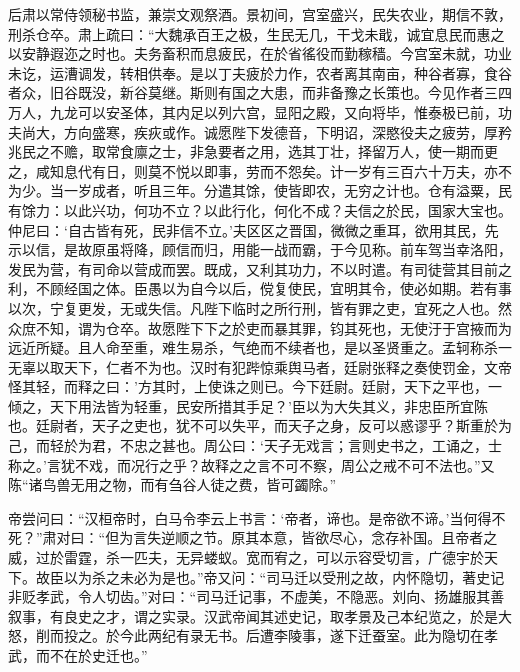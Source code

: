 \documentclass[12pt,UTF8]{ctexbook}
\begin{document}
后肃以常侍领秘书监，兼崇文观祭酒。景初间，宫室盛兴，民失农业，期信不敦，刑杀仓卒。肃上疏曰：“大魏承百王之极，生民无几，干戈未戢，诚宜息民而惠之以安静遐迩之时也。夫务畜积而息疲民，在於省徭役而勤稼穑。今宫室未就，功业未讫，运漕调发，转相供奉。是以丁夫疲於力作，农者离其南亩，种谷者寡，食谷者众，旧谷既没，新谷莫继。斯则有国之大患，而非备豫之长策也。今见作者三四万人，九龙可以安圣体，其内足以列六宫，显阳之殿，又向将毕，惟泰极已前，功夫尚大，方向盛寒，疾疢或作。诚愿陛下发德音，下明诏，深愍役夫之疲劳，厚矜兆民之不赡，取常食廪之士，非急要者之用，选其丁壮，择留万人，使一期而更之，咸知息代有日，则莫不悦以即事，劳而不怨矣。计一岁有三百六十万夫，亦不为少。当一岁成者，听且三年。分遣其馀，使皆即农，无穷之计也。仓有溢粟，民有馀力：以此兴功，何功不立？以此行化，何化不成？夫信之於民，国家大宝也。仲尼曰：‘自古皆有死，民非信不立。’夫区区之晋国，微微之重耳，欲用其民，先示以信，是故原虽将降，顾信而归，用能一战而霸，于今见称。前车驾当幸洛阳，发民为营，有司命以营成而罢。既成，又利其功力，不以时遣。有司徒营其目前之利，不顾经国之体。臣愚以为自今以后，傥复使民，宜明其令，使必如期。若有事以次，宁复更发，无或失信。凡陛下临时之所行刑，皆有罪之吏，宜死之人也。然众庶不知，谓为仓卒。故愿陛下下之於吏而暴其罪，钧其死也，无使汙于宫掖而为远近所疑。且人命至重，难生易杀，气绝而不续者也，是以圣贤重之。孟轲称杀一无辜以取天下，仁者不为也。汉时有犯跸惊乘舆马者，廷尉张释之奏使罚金，文帝怪其轻，而释之曰：'方其时，上使诛之则已。今下廷尉。廷尉，天下之平也，一倾之，天下用法皆为轻重，民安所措其手足？'臣以为大失其义，非忠臣所宜陈也。廷尉者，天子之吏也，犹不可以失平，而天子之身，反可以惑谬乎？斯重於为己，而轻於为君，不忠之甚也。周公曰：‘天子无戏言；言则史书之，工诵之，士称之。’言犹不戏，而况行之乎？故释之之言不可不察，周公之戒不可不法也。”又陈“诸鸟兽无用之物，而有刍谷人徒之费，皆可蠲除。”

帝尝问曰：“汉桓帝时，白马令李云上书言：‘帝者，谛也。是帝欲不谛。’当何得不死？”肃对曰：“但为言失逆顺之节。原其本意，皆欲尽心，念存补国。且帝者之威，过於雷霆，杀一匹夫，无异蝼蚁。宽而宥之，可以示容受切言，广德宇於天下。故臣以为杀之未必为是也。”帝又问：“司马迁以受刑之故，内怀隐切，著史记非贬孝武，令人切齿。”对曰：“司马迁记事，不虚美，不隐恶。刘向、扬雄服其善叙事，有良史之才，谓之实录。汉武帝闻其述史记，取孝景及己本纪览之，於是大怒，削而投之。於今此两纪有录无书。后遭李陵事，遂下迁蚕室。此为隐切在孝武，而不在於史迁也。”
\end{document}
